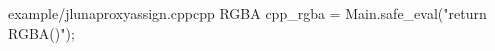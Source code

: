 \begin{fileminted}{example/jlunaproxyassign.cpp}{cpp}
RGBA cpp_rgba = Main.safe_eval("return RGBA()");
\end{fileminted}